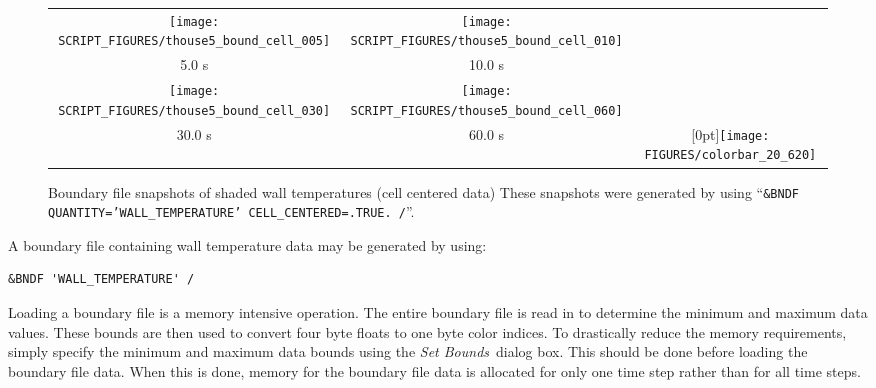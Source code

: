 \documentclass[11pt,twoside]{book}
\begin{document}
\begin{figure}[\figoptions]
\begin{center}
\begin{tabular}{ccc}
\texttt{[image: SCRIPT\_FIGURES/thouse5\_bound\_cell\_005]}&
\texttt{[image: SCRIPT\_FIGURES/thouse5\_bound\_cell\_010]}\\
5.0 s&10.0 s\\
\texttt{[image: SCRIPT\_FIGURES/thouse5\_bound\_cell\_030]}&
\texttt{[image: SCRIPT\_FIGURES/thouse5\_bound\_cell\_060]}\\
30.0 s&60.0 s
&\raisebox{0.0ex}[0pt]{\texttt{[image: FIGURES/colorbar\_20\_620]}}\\
\end{tabular}
\end{center}
\caption [Boundary file snapshots of shaded wall temperatures
contours (cell centered data).] {Boundary file snapshots of shaded
wall temperatures (cell centered data) These snapshots were
generated by using ``{\tt\&BNDF QUANTITY='WALL\_TEMPERATURE'
CELL\_CENTERED=.TRUE. /}''. }
\label{figboundary_cell_centered}%
\end{figure}
A boundary file containing wall temperature data may be generated
by using:
\begin{lstlisting}
&BNDF 'WALL_TEMPERATURE' /
\end{lstlisting}
Loading a boundary file is a memory intensive operation.  The
entire boundary file is read in to determine the minimum and
maximum data values.  These bounds are then used to convert four
byte floats to one byte color indices.  To drastically reduce the
memory requirements, simply specify the minimum and maximum data
bounds using the {\em Set Bounds}\ dialog box.  This should be
done before loading the boundary file data.  When this is done,
memory for the boundary file data is allocated for only one time
step rather than for all time steps.
\end{document}
